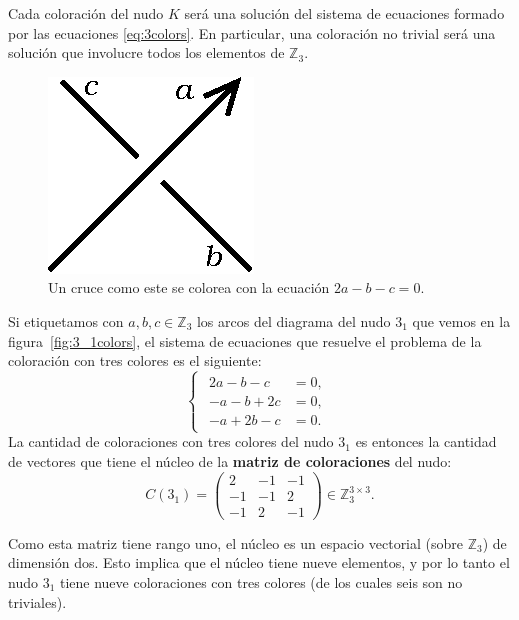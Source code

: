 \documentclass[graybox]{svmult}
\newcommand{\Z}{\mathbb{Z}}
\begin{document}
Cada coloración del nudo $K$ será una solución del sistema de ecuaciones
formado por las ecuaciones \eqref{eq:3colors}. En particular, una
coloración no trivial será una solución que involucre todos los elementos
de $\Z_3$. 

\begin{figure}[ht]
	\centering
	\includegraphics[scale=0.6]{images/crossing}
	\caption{Un cruce como este se colorea con la ecuación $2a-b-c=0$.}
	\label{fig:crossing}
\end{figure}

\begin{example}
	\label{exa:3_1:3colors}
	Si etiquetamos con $a,b,c\in\Z_3$ los arcos del diagrama del nudo $3_1$ que vemos 
	en la figura~\ref{fig:3_1colors}, el sistema
	de ecuaciones que resuelve el problema de la coloración con tres colores es el
	siguiente:
	\[
		\begin{cases}
			\begin{aligned}
				2a-b-c&=0,\\
				-a-b+2c&=0,\\
				-a+2b-c&=0.
			\end{aligned}
		\end{cases}
	\]
	La cantidad de coloraciones con tres colores del nudo $3_1$ es entonces la
	cantidad de vectores que tiene el núcleo de la \textbf{matriz de coloraciones}
	del nudo:
	\begin{equation*}
		C(3_1)=\begin{pmatrix}
			2 & -1 & -1\\
			-1 & -1 & 2\\
			-1 & 2 & -1
		\end{pmatrix}\in\Z_3^{3\times3}.
	\end{equation*}

    Como esta matriz tiene rango uno, el núcleo es un espacio vectorial (sobre
    $\Z_3$) de dimensión dos. Esto implica que el núcleo tiene nueve elementos,
    y por lo tanto el nudo $3_1$ tiene nueve coloraciones con tres colores (de los
    cuales seis son no triviales).
\end{example}
\end{document}
